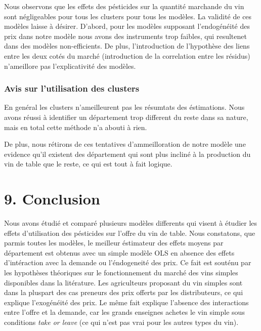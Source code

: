 \documentclass[11pt,]{article}
\begin{document}
\FloatBarrier

Nous observons que les effets des pésticides sur la quantité marchande
du vin sont négligeables pour tous les clusters pour tous les modèles.
La validité de ces modèles laisse à désirer. D'abord, pour les modèles
supposant l'endogénéité des prix dans notre modèle nous avons des
instruments trop faibles, qui resultenet dans des modèles
non-efficients. De plus, l'introduction de l'hypothèse des liens entre
les deux cotés du marché (introduction de la correlation entre les
résidus) n'ameillore pas l'explicativité des modèles.

\hypertarget{avis-sur-lutilisation-des-clusters}{%
\subsubsection{Avis sur l'utilisation des
clusters}\label{avis-sur-lutilisation-des-clusters}}

En genéral les clusters n'ameilleurent pas les résumtats des
éstimations. Nous avons réussi à identifier un département trop
different du reste dans sa nature, mais en total cette méthode n'a
abouti à rien.

De plus, nous rétirons de ces tentatives d'ammeilloration de notre
modèle une evidence qu'il existent des département qui sont plus incliné
à la production du vin de table que le reste, ce qui est tout à fait
logique.

\hypertarget{conclusion}{%
\section{9. Conclusion}\label{conclusion}}

Nous avons étudié et comparé plusieurs modèles differents qui visent à
étudier les effets d'utilisation des pésticides sur l'offre du vin de
table. Nous constatons, que parmis toutes les modèles, le meilleur
éstimateur des effets moyens par département est obtenus avec un simple
modèle OLS en absence des effets d'intéraction avec la demande ou
l'éndogeneité des prix. Ce fait est souténu par les hypothèses
théoriques sur le fonctionnement du marché des vins simples disponibles
dans la litérature. Les agriculteurs proposant du vin simples sont dans
la pluspart des cas preneurs des prix offerts par les distributeurs, ce
qui explique l'exogénéité des prix. Le même fait explique l'absence des
interactions entre l'offre et la demande, car les grands enseignes
achetes le vin simple sous conditions \emph{take or leave} (ce qui n'est
pas vrai pour les autres types du vin).
\end{document}
